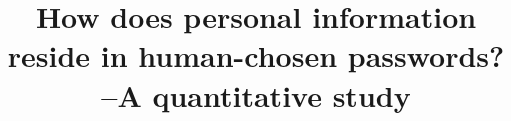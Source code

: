 \documentclass{sig-alternate}
\begin{document}
%

\title{How does personal information reside in human-chosen passwords? \\ --A quantitative study}

%
%
%
%
\end{document}
